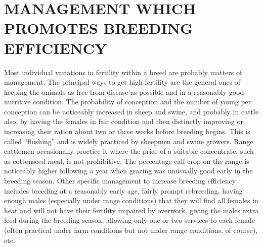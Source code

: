 \section*{MANAGEMENT WHICH PROMOTES BREEDING EFFICIENCY}

Most individual variations in fertility within a breed are probably
matters of management. The principal ways to get high fertility are the
general ones of keeping the animals as free from disease as possible and
in a reasonably good nutritive condition. The probability of conception
and the number of young per conception can be noticeably increased in
sheep and swine, and probably in cattle also, by having the females in
fair condition and then distinctly improving or increasing their ration
about two or three weeks before breeding begins. This is called
``flushing''
and is widely practiced by sheepmen and swine growers. Range
cattlemen occasionally practice it where the price of a suitable concentrate,
such as cottonseed meal, is not prohibitive. The percentage calf
crop on the range is noticeably higher following a year when grazing
was unusually good early in the breeding season. Other specific management
to increase breeding efficiency includes breeding at a reasonably
early age, fairly prompt rebreeding, having enough males (especially
under range conditions) that they will find all females in heat and will
not have their fertility impaired by overwork, giving the males extra
feed during the breeding season, allowing only one or two services to
each female (often practical under farm conditions but not under range
conditions, of course), etc.

